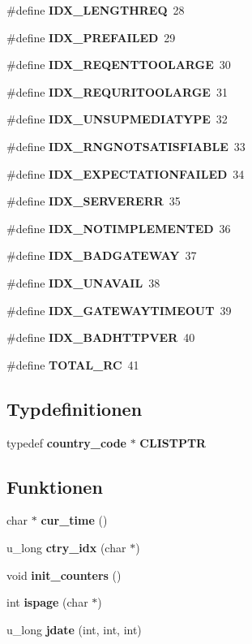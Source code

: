 \begin{CompactItemize}
\item 
\#define {\bf IDX\_\-LENGTHREQ}~28
\item 
\#define {\bf IDX\_\-PREFAILED}~29
\item 
\#define {\bf IDX\_\-REQENTTOOLARGE}~30
\item 
\#define {\bf IDX\_\-REQURITOOLARGE}~31
\item 
\#define {\bf IDX\_\-UNSUPMEDIATYPE}~32
\item 
\#define {\bf IDX\_\-RNGNOTSATISFIABLE}~33
\item 
\#define {\bf IDX\_\-EXPECTATIONFAILED}~34
\item 
\#define {\bf IDX\_\-SERVERERR}~35
\item 
\#define {\bf IDX\_\-NOTIMPLEMENTED}~36
\item 
\#define {\bf IDX\_\-BADGATEWAY}~37
\item 
\#define {\bf IDX\_\-UNAVAIL}~38
\item 
\#define {\bf IDX\_\-GATEWAYTIMEOUT}~39
\item 
\#define {\bf IDX\_\-BADHTTPVER}~40
\item 
\#define {\bf TOTAL\_\-RC}~41
\end{CompactItemize}
\subsection*{Typdefinitionen}
\begin{CompactItemize}
\item 
typedef {\bf country\_\-code} $\ast$ {\bf CLISTPTR}
\end{CompactItemize}
\subsection*{Funktionen}
\begin{CompactItemize}
\item 
char $\ast$ {\bf cur\_\-time} ()
\item 
u\_\-long {\bf ctry\_\-idx} (char $\ast$)
\item 
void {\bf init\_\-counters} ()
\item 
int {\bf ispage} (char $\ast$)
\item 
u\_\-long {\bf jdate} (int, int, int)
\end{CompactItemize}
